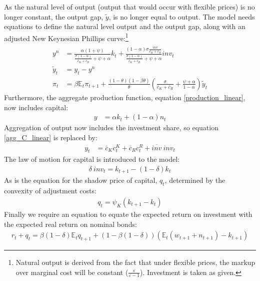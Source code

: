 \documentclass[titlepage]{\econtex}\newcommand{\texname}{ConsumptionHeterogeneity}
\begin{document}
As the natural level of output (output that would occur with flexible prices) is no longer constant, the output gap, $\tilde{y}$, is no longer equal to output. The model needs equations to define the natural level output and the output gap, along with an adjusted New Keynesian Phillips curve:\footnote{Natural output is derived from the fact that under flexible prices, the markup over marginal cost will be constant ($\frac{\varepsilon}{\varepsilon-1}$). Investment is taken as given.}
\begin{align}
y^{n} &= \frac{\alpha(1+\psi)}{\frac{\sigma (1-\alpha) }{\overline{c}_{K}+\overline{c}_{R}} + \psi+ \alpha} k_{t} +\frac{(1-\alpha) \sigma \frac{\overline{\textit{inv}}}{\overline{c}_{K}+\overline{c}_{R}}}{ \frac{\sigma (1-\alpha)}{\overline{c}_{K}+\overline{c}_{R}} + \psi + \alpha} \textit{inv}_t \label{y_nat_linear} \\
\tilde{y}_t &= y_t - y^{n}	\label{output_gap_linear} \\
\pi_t &=\beta \mathbb{E}_t\pi_{t+1}+\frac{(1-\theta)(1-\beta\theta)}{\theta}\left( \frac{\sigma}{\overline{c}_{K}+\overline{c}_{R}} +  \frac{\psi + \alpha}{1-\alpha} \right)\tilde{y}_t \label{NKphillips_linear_capital}
\end{align}
Furthermore, the aggregate production function, equation \ref{production_linear}, now includes capital:
\begin{align}
y &= \alpha k_t +  (1-\alpha)n_t  \label{production_capital_linear}
\end{align}
Aggregation of output now includes the investment share, so equation \ref{agg_C_linear} is replaced by:
\begin{align}
y_t &= \overline{c}_{K} c^K_t + \overline{c}_{R} c^R_t + \overline{\textit{inv}} \ \textit{inv}_t \label{agg_Y_linear}
\end{align}
The law of motion for capital is introduced to the model:
\begin{align}
\delta \ \textit{inv}_t = k_{t+1} - (1-\delta) k_{t}    \label{lom_capital}
\end{align}
As is the equation for the shadow price of capital, $q_t$, determined by the convexity of adjustment costs:
\begin{align}
q_t = \psi_K (k_{t+1}-k_t)	\label{shadow_K}
\end{align}
Finally we require an equation to equate the expected return on investment with the expected real return on nominal bonds:
\begin{align}
r_t + q_t = \beta (1-\delta) \mathbb{E}_t q_{t+1} + (1 - \beta (1-\delta)) (\mathbb{E}_t (w_{t+1} + n_{t+1}) - k_{t+1})	\label{return_K}
\end{align}
\end{document}
